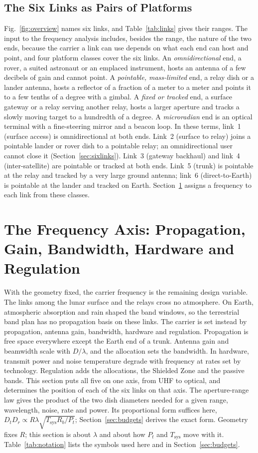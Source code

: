 \documentclass{IEEEoj}
\begin{document}
\subsection{The Six Links as Pairs of Platforms}
\label{sec:links}
Fig.~\ref{fig:overview} names six links, and Table~\ref{tab:links} gives their ranges. The input to the frequency analysis includes, besides the range, the nature of the two ends, because the carrier a link can use depends on what each end can host and point, and four platform classes cover the six links. An \emph{omnidirectional} end, a rover, a suited astronaut or an emplaced instrument, hosts an antenna of a few decibels of gain and cannot point. A \emph{pointable, mass-limited} end, a relay dish or a lander antenna, hosts a reflector of a fraction of a meter to a meter and points it to a few tenths of a degree with a gimbal. A \emph{fixed or tracked} end, a surface gateway or a relay serving another relay, hosts a larger aperture and tracks a slowly moving target to a hundredth of a degree. A \emph{microradian} end is an optical terminal with a fine-steering mirror and a beacon loop. In these terms, link~1 (surface access) is omnidirectional at both ends. Link~2 (surface to relay) joins a pointable lander or rover dish to a pointable relay; an omnidirectional user cannot close it (Section~\ref{sec:sixlinks}). Link~3 (gateway backhaul) and link~4 (inter-satellite) are pointable or tracked at both ends. Link~5 (trunk) is pointable at the relay and tracked by a very large ground antenna; link~6 (direct-to-Earth) is pointable at the lander and tracked on Earth. Section~\ref{sec:frequency} assigns a frequency to each link from these classes.


\section{The Frequency Axis: Propagation, Gain, Bandwidth, Hardware and Regulation}
\label{sec:frequency}
With the geometry fixed, the carrier frequency is the remaining design variable. The links among the lunar surface and the relays cross no atmosphere. On Earth, atmospheric absorption and rain shaped the band windows, so the terrestrial band plan has no propagation basis on these links. The carrier is set instead by propagation, antenna gain, bandwidth, hardware and regulation. Propagation is free space everywhere except the Earth end of a trunk. Antenna gain and beamwidth scale with $D/\lambda$, and the allocation sets the bandwidth. In hardware, transmit power and noise temperature degrade with frequency at rates set by technology. Regulation adds the allocations, the Shielded Zone and the passive bands. This section puts all five on one axis, from UHF to optical, and determines the position of each of the six links on that axis. The aperture-range law gives the product of the two dish diameters needed for a given range, wavelength, noise, rate and power. Its proportional form suffices here, $D_t D_r \propto R\lambda\sqrt{T_{\mathrm{sys}} R_b / P_t}$; Section~\ref{sec:budgets} derives the exact form. Geometry fixes $R$; this section is about $\lambda$ and about how $P_t$ and $T_{\mathrm{sys}}$ move with it. Table~\ref{tab:notation} lists the symbols used here and in Section~\ref{sec:budgets}.
\end{document}
